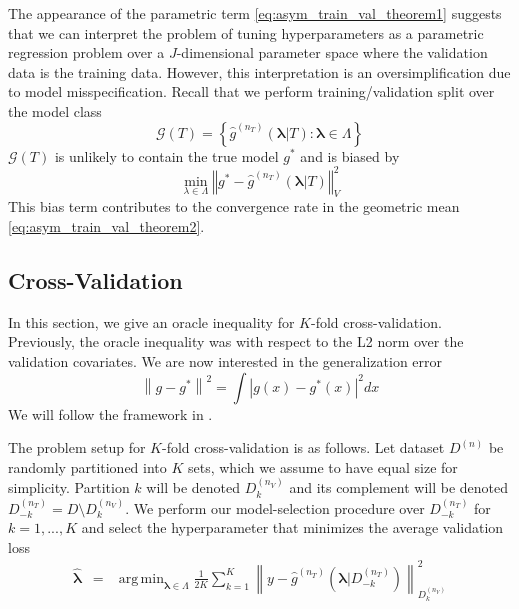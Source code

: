 \documentclass[12pt]{article}
\DeclareMathOperator*{\argmin}{arg\,min}
\begin{document}
The appearance of the parametric term \eqref{eq:asym_train_val_theorem1} suggests that we can interpret the problem of tuning hyperparameters as a parametric regression problem over a $J$-dimensional parameter space where the validation data is the training data. However, this interpretation is an oversimplification due to model misspecification. Recall that we perform training/validation split over the model class
\begin{equation}
\mathcal{G}(T) = \left \{ \hat{g}^{(n_T)}( {\boldsymbol{\lambda}}| T) : \boldsymbol{\lambda} \in \Lambda \right \}
\end{equation}
$\mathcal{G}(T)$ is unlikely to contain the true model $g^*$ and is biased by
\begin{equation}
\min_{\lambda \in \Lambda} \left\Vert g^* - \hat{g}^{(n_T)}( \boldsymbol{\lambda}|T) \right \Vert^2_{V}
\end{equation}
This bias term contributes to the convergence rate in the geometric mean \eqref{eq:asym_train_val_theorem2}.

\subsection{Cross-Validation}

In this section, we give an oracle inequality for $K$-fold cross-validation. Previously, the oracle inequality was with respect to the L2 norm over the validation covariates. We are now interested in the generalization error
\begin{equation}
\left \| g - g^* \right \|^2 = \int \left |g(x) - g^*(x) \right |^2 dx
\end{equation}
We will follow the framework in \citet{lecue2012oracle}.

The problem setup for $K$-fold cross-validation is as follows. Let dataset $D^{(n)}$ be randomly partitioned into $K$ sets, which we assume to have equal size for simplicity. Partition $k$ will be denoted $D_k^{(n_V)}$ and its complement will be denoted $D_{-k}^{(n_T)} = D \setminus D_k^{(n_V)}$. We perform our model-selection procedure over $D_{-k}^{(n_T)}$ for $k=1,...,K$ and select the hyperparameter that minimizes the average validation loss
\begin{eqnarray}
\label{kfold_opt}
\hat{\boldsymbol \lambda} &=& \argmin_{\boldsymbol{\lambda} \in\Lambda} \frac{1}{2K} \sum_{k=1}^K  \left \| y-\hat{g}^{(n_T)}(\boldsymbol \lambda | D_{-k}^{(n_T)}) \right \|_{D_k^{(n_V)}}^{2}
\end{eqnarray}
\end{document}

